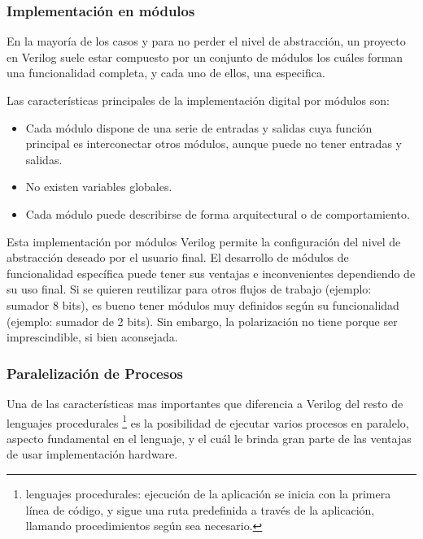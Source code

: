 \subsubsection{Implementación en módulos}
En la mayoría de los casos y para no perder el nivel de abstracción, un proyecto en Verilog suele estar compuesto por un conjunto de módulos los cuáles forman una funcionalidad completa, y cada uno de ellos, una especifica. \newline

Las características principales de la implementación digital por módulos son:
\begin{itemize}
	\item Cada módulo dispone de una serie de entradas y salidas cuya función principal es interconectar otros módulos, aunque puede no tener entradas y salidas.
	\item No existen variables globales.
	\item Cada módulo puede describirse de forma arquitectural o de comportamiento.
\end{itemize}

Esta implementación por módulos Verilog permite la configuración del nivel de abstracción deseado por el usuario final. El desarrollo de módulos de funcionalidad específica puede tener sus ventajas e inconvenientes dependiendo de su uso final. Si se quieren reutilizar para otros flujos de trabajo (ejemplo: sumador 8 bits), es bueno tener módulos muy definidos según su funcionalidad (ejemplo: sumador de 2 bits). Sin embargo, la polarización no tiene porque ser imprescindible, si bien aconsejada.

\subsubsection{Paralelización de Procesos}
Una de las características mas importantes que diferencia a Verilog del resto de lenguajes procedurales \footnote{lenguajes procedurales: ejecución de la aplicación se inicia con la primera línea de código, y sigue una ruta predefinida a través de la aplicación, llamando procedimientos según sea necesario.} es la posibilidad de ejecutar varios procesos en paralelo, aspecto fundamental en el lenguaje, y el cuál le brinda gran parte de las ventajas de usar implementación hardware.

